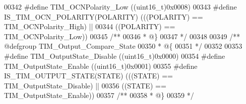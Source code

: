 \begin{DoxyCode}
00342 \textcolor{preprocessor}{#}\textcolor{preprocessor}{define} \textcolor{preprocessor}{TIM\_OCNPolarity\_Low}                \textcolor{preprocessor}{(}\textcolor{preprocessor}{(}\textcolor{preprocessor}{uint16\_t}\textcolor{preprocessor}{)}0x0008\textcolor{preprocessor}{)}
00343 \textcolor{preprocessor}{#}\textcolor{preprocessor}{define} \textcolor{preprocessor}{IS\_TIM\_OCN\_POLARITY}\textcolor{preprocessor}{(}\textcolor{preprocessor}{POLARITY}\textcolor{preprocessor}{)} \textcolor{preprocessor}{(}\textcolor{preprocessor}{(}\textcolor{preprocessor}{(}\textcolor{preprocessor}{POLARITY}\textcolor{preprocessor}{)} \textcolor{preprocessor}{==} TIM_OCNPolarity_High\textcolor{preprocessor}{)} \textcolor{preprocessor}{||}
00344                                        \textcolor{preprocessor}{(}\textcolor{preprocessor}{(}\textcolor{preprocessor}{POLARITY}\textcolor{preprocessor}{)} \textcolor{preprocessor}{==} TIM_OCNPolarity_Low\textcolor{preprocessor}{)}\textcolor{preprocessor}{)}
00345 \textcolor{comment}{/**}
00346 \textcolor{comment}{  * @\}}
00347 \textcolor{comment}{  */}
00348 
00349 \textcolor{comment}{/** @defgroup TIM\_Output\_Compare\_State }
00350 \textcolor{comment}{  * @\{}
00351 \textcolor{comment}{  */}
00352 
00353 \textcolor{preprocessor}{#}\textcolor{preprocessor}{define} \textcolor{preprocessor}{TIM\_OutputState\_Disable}            \textcolor{preprocessor}{(}\textcolor{preprocessor}{(}\textcolor{preprocessor}{uint16\_t}\textcolor{preprocessor}{)}0x0000\textcolor{preprocessor}{)}
00354 \textcolor{preprocessor}{#}\textcolor{preprocessor}{define} \textcolor{preprocessor}{TIM\_OutputState\_Enable}             \textcolor{preprocessor}{(}\textcolor{preprocessor}{(}\textcolor{preprocessor}{uint16\_t}\textcolor{preprocessor}{)}0x0001\textcolor{preprocessor}{)}
00355 \textcolor{preprocessor}{#}\textcolor{preprocessor}{define} \textcolor{preprocessor}{IS\_TIM\_OUTPUT\_STATE}\textcolor{preprocessor}{(}\textcolor{preprocessor}{STATE}\textcolor{preprocessor}{)} \textcolor{preprocessor}{(}\textcolor{preprocessor}{(}\textcolor{preprocessor}{(}\textcolor{preprocessor}{STATE}\textcolor{preprocessor}{)} \textcolor{preprocessor}{==} TIM_OutputState_Disable\textcolor{preprocessor}{)} \textcolor{preprocessor}{||}
00356                                     \textcolor{preprocessor}{(}\textcolor{preprocessor}{(}\textcolor{preprocessor}{STATE}\textcolor{preprocessor}{)} \textcolor{preprocessor}{==} TIM_OutputState_Enable\textcolor{preprocessor}{)}\textcolor{preprocessor}{)}
00357 \textcolor{comment}{/**}
00358 \textcolor{comment}{  * @\}}
00359 \textcolor{comment}{  */}

\end{DoxyCode}
